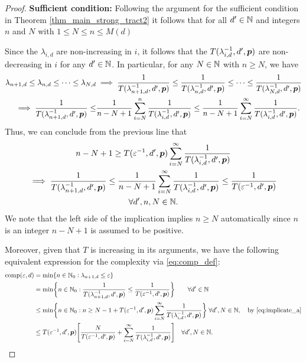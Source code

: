 \documentclass[11pt,a4paper]{article}
\begin{document}
\begin{proof}
\textbf{Sufficient condition:}\newline
Following the argument for the sufficient condition in Theorem \ref{thm_main_strong_tract2} it follows that for all $d' \in \mathbb{N}$ and integers $n$ and $N$ with $1 \le N \le n \le M(d)$

Since the $\lambda_{i,d}$ are non-increasing in $i$, it follows that the $T(\lambda_{i,d}^{-1},d',\boldsymbol{p})$ are non-decreasing in $i$ for any $d'\in\mathbb{N}$. In particular, for  any $N\in\mathbb{N}$ with $n\ge N$, we have
\begin{align*}
    \lambda_{n+1,d} \le \lambda_{n,d} \le \cdots \le \lambda_{N,d}
    & \implies \frac{1}{T(\lambda_{n+1, d}^{-1},d',\boldsymbol{p})} \le \frac{1}{T(\lambda_{n, d}^{-1},d',\boldsymbol{p})} \le \cdots \le \frac{1}{T(\lambda_{N, d}^{-1},d',\boldsymbol{p})} \\
     \implies \frac{1}{T(\lambda_{n+1, d}^{-1},d',\boldsymbol{p}) }
    \le &\frac{1}{n-N+1} \sum_{i=N}^n  \frac{1}{T(\lambda_{i, d}^{-1},d',\boldsymbol{p}) }
    \le \frac{1}{n-N+1} \sum_{i=N}^\infty  \frac{1}{T(\lambda_{i, d}^{-1},d',\boldsymbol{p})}.
\end{align*}
Thus, we can conclude from the previous line that
\begin{multline} \label{eq:implicate_a}
    n - N +1 \ge T(\varepsilon^{-1},d',\boldsymbol{p}) \sum_{i=N}^\infty \frac{1}{T(\lambda_{i, d}^{-1},d',\boldsymbol{p})} \\
   \implies   \frac{1}{T(\lambda_{n+1, d}^{-1},d',\boldsymbol{p})} \le
   \frac{1}{n-N+1} \sum_{i=N}^\infty \frac{1}{T(\lambda_{i, d}^{-1},d',\boldsymbol{p}) } \le \frac{1}{T(\varepsilon^{-1},d',\boldsymbol{p})} \\ \forall d', n, N \in \mathbb{N}.
\end{multline}
We note that the left side of the implication implies $n \ge N$ automatically since $n$ is an integer  $n - N +1$ is assumed to be positive.

Moreover, given that $T$ is increasing in its arguments, we have the following equivalent expression for the complexity via \eqref{eq:comp_def}:
\begin{align} %
	\nonumber
	\comp(\varepsilon, d) & = \min \{n \in \natzero : \lambda_{n+1, d} \le \varepsilon\} \\
	\nonumber
	& = \min \biggl\{n \in \natzero : \frac{1}{T(\lambda_{n+1,d}^{-1},d',\vp)}\le \frac{1}{T(\varepsilon^{-1},d',\vp) }\biggr\} \qquad  \forall d'\in \naturals\\
	\nonumber
	& \le  \min \biggl\{n \in \natzero : n \ge N - 1 + T(\varepsilon^{-1},d',\vp) \sum_{i=N}^\infty \frac{1}{T(\lambda_{i, d}^{-1},d',\vp)} \biggr\} \;  \forall  d', N \in \naturals, \quad \text{by \eqref{eq:implicate_a}} \\ 
	& \le  T(\varepsilon^{-1},d',\vp) \Biggl [\frac{N}{T(\varepsilon^{-1},d',\vp)}  +  \sum_{i=N}^\infty \frac{1}{T(\lambda_{i, d}^{-1},d',\vp)} \Biggr] \quad \forall  d', N \in \naturals. \label{eq:compUP}
\end{align}


\end{proof}
\end{document}
